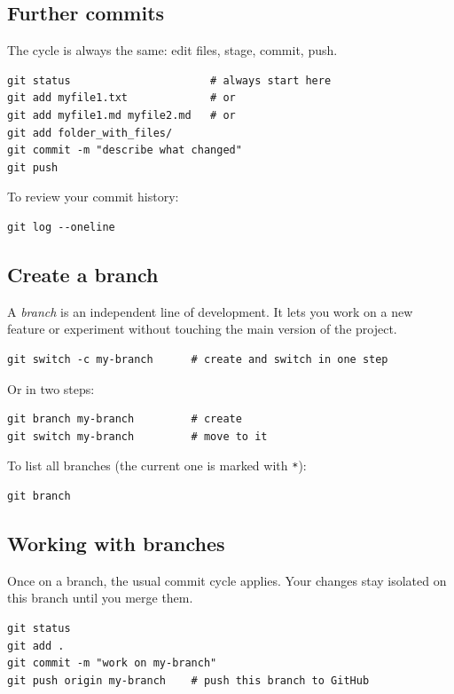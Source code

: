 \documentclass[12pt]{article}
\begin{document}
\subsection{Further commits}

The cycle is always the same: edit files, stage, commit, push.

\begin{verbatim}
git status                      # always start here
git add myfile1.txt             # or 
git add myfile1.md myfile2.md   # or 
git add folder_with_files/
git commit -m "describe what changed"
git push
\end{verbatim}

To review your commit history:

\begin{verbatim}
git log --oneline
\end{verbatim}

\subsection{Create a branch}

A \emph{branch} is an independent line of development. It lets you work on a new feature or experiment without touching the main version of the project.

\begin{verbatim}
git switch -c my-branch      # create and switch in one step
\end{verbatim}

Or in two steps:

\begin{verbatim}
git branch my-branch         # create
git switch my-branch         # move to it
\end{verbatim}

To list all branches (the current one is marked with \texttt{*}):

\begin{verbatim}
git branch
\end{verbatim}

\subsection{Working with branches}

Once on a branch, the usual commit cycle applies. Your changes stay isolated on this branch until you merge them.

\begin{verbatim}
git status
git add .
git commit -m "work on my-branch"
git push origin my-branch    # push this branch to GitHub
\end{verbatim}
\end{document}
